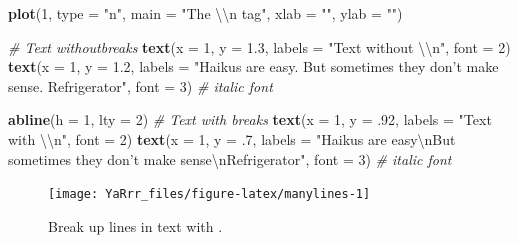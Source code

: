 \documentclass[]{book}
\newenvironment{Shaded}{\begin{snugshade}}{\end{snugshade}}
\newcommand{\KeywordTok}[1]{\textcolor[rgb]{0.13,0.29,0.53}{\textbf{{#1}}}}
\newcommand{\DataTypeTok}[1]{\textcolor[rgb]{0.13,0.29,0.53}{{#1}}}
\newcommand{\DecValTok}[1]{\textcolor[rgb]{0.00,0.00,0.81}{{#1}}}
\newcommand{\FloatTok}[1]{\textcolor[rgb]{0.00,0.00,0.81}{{#1}}}
\newcommand{\CharTok}[1]{\textcolor[rgb]{0.31,0.60,0.02}{{#1}}}
\newcommand{\StringTok}[1]{\textcolor[rgb]{0.31,0.60,0.02}{{#1}}}
\newcommand{\CommentTok}[1]{\textcolor[rgb]{0.56,0.35,0.01}{\textit{{#1}}}}
\newcommand{\NormalTok}[1]{{#1}}
\theoremstyle{definition}
\theoremstyle{definition}
\theoremstyle{remark}
\begin{document}
\begin{Shaded}
\begin{Highlighting}[]
\KeywordTok{plot}\NormalTok{(}\DecValTok{1}\NormalTok{, }
     \DataTypeTok{type =} \StringTok{"n"}\NormalTok{,}
     \DataTypeTok{main =} \StringTok{"The }\CharTok{\textbackslash{}\textbackslash{}}\StringTok{n tag"}\NormalTok{,}
     \DataTypeTok{xlab =} \StringTok{""}\NormalTok{, }\DataTypeTok{ylab =} \StringTok{""}\NormalTok{)}

\CommentTok{# Text withoutbreaks}
\KeywordTok{text}\NormalTok{(}\DataTypeTok{x =} \DecValTok{1}\NormalTok{, }\DataTypeTok{y =} \FloatTok{1.3}\NormalTok{, }\DataTypeTok{labels =} \StringTok{"Text without }\CharTok{\textbackslash{}\textbackslash{}}\StringTok{n"}\NormalTok{, }\DataTypeTok{font =} \DecValTok{2}\NormalTok{)}
\KeywordTok{text}\NormalTok{(}\DataTypeTok{x =} \DecValTok{1}\NormalTok{, }\DataTypeTok{y =} \FloatTok{1.2}\NormalTok{,}
     \DataTypeTok{labels =} \StringTok{"Haikus are easy. But sometimes they don't make sense. Refrigerator"}\NormalTok{,}
     \DataTypeTok{font =} \DecValTok{3}\NormalTok{) }\CommentTok{# italic font}

\KeywordTok{abline}\NormalTok{(}\DataTypeTok{h =} \DecValTok{1}\NormalTok{, }\DataTypeTok{lty =} \DecValTok{2}\NormalTok{)}
\CommentTok{# Text with  breaks}
\KeywordTok{text}\NormalTok{(}\DataTypeTok{x =} \DecValTok{1}\NormalTok{, }\DataTypeTok{y =} \NormalTok{.}\DecValTok{92}\NormalTok{, }\DataTypeTok{labels =} \StringTok{"Text with }\CharTok{\textbackslash{}\textbackslash{}}\StringTok{n"}\NormalTok{, }\DataTypeTok{font =} \DecValTok{2}\NormalTok{)}
\KeywordTok{text}\NormalTok{(}\DataTypeTok{x =} \DecValTok{1}\NormalTok{, }\DataTypeTok{y =} \NormalTok{.}\DecValTok{7}\NormalTok{,}
     \DataTypeTok{labels =} \StringTok{"Haikus are easy}\CharTok{\textbackslash{}n}\StringTok{But sometimes they don't make sense}\CharTok{\textbackslash{}n}\StringTok{Refrigerator"}\NormalTok{,}
     \DataTypeTok{font =} \DecValTok{3}\NormalTok{)   }\CommentTok{# italic font}
\end{Highlighting}
\end{Shaded}

\begin{figure}

{\centering \texttt{[image: YaRrr\_files/figure-latex/manylines-1]} 

}

\caption{Break up lines in text with 
.}\label{fig:manylines}
\end{figure}
\end{document}
